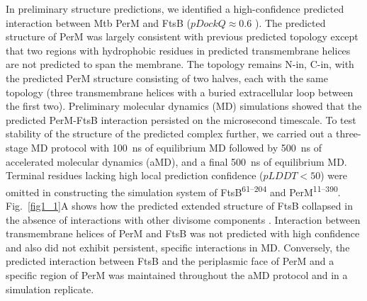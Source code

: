 \documentclass[pdflatex,sn-basic]{sn-jnl}%
\newcommand\mtb{Mtb}
\begin{document}
In preliminary structure predictions, we identified a high-confidence predicted interaction between \mtb{} PerM and FtsB ($pDockQ \approx 0.6$ \citep{bryantImprovedPredictionProteinprotein2022}).
The predicted structure of PerM was largely consistent with previous predicted topology \citep{goodsmithDisruptionTuberculosisMembrane2015} except that two regions with hydrophobic residues in predicted transmembrane helices are not predicted to span the membrane.
The topology remains N-in, C-in, with the predicted PerM structure consisting of two halves, each with the same topology (three transmembrane helices with a buried extracellular loop between the first two).
Preliminary molecular dynamics (MD) simulations showed that the predicted PerM-FtsB interaction persisted on the microsecond timescale.
To test stability of the structure of the predicted complex further, we carried out a three-stage MD protocol with \qty{100}{\ns} of equilibrium MD followed by \qty{500}{\ns} of accelerated molecular dynamics (aMD), and a final \qty{500}{\ns} of equilibrium MD.
Terminal residues lacking high local prediction confidence ($pLDDT < 50$) were omitted in constructing the simulation system of FtsB\textsuperscript{61--204} and PerM\textsuperscript{11--390}.
Fig.~\ref{fig1_1}A shows how the predicted extended structure of FtsB collapsed in the absence of interactions with other divisome components \citep{brittonConformationalChangesEssential2023,cravenModelInteractionsFtsQLB2022,attaibiUpdatedModelDivisome2022,kashammerCryoEMStructureBacterial2023}.
Interaction between transmembrane helices of PerM and FtsB was not predicted with high confidence and also did not exhibit persistent, specific interactions in MD.
Conversely, the predicted interaction between FtsB and the periplasmic face of PerM and a specific region of PerM was maintained throughout the aMD protocol and in a simulation replicate.
\end{document}
